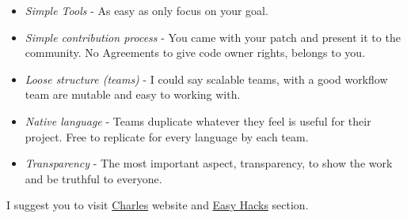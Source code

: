 \begin{itemize}
	\item \textit{Simple Tools} - As easy as only focus on your goal.
	\item \textit{Simple contribution process} - You came with your patch and present it to the community. No Agreements to give code owner rights, belongs to you.
	\item \textit{Loose structure (teams) }- I could say scalable teams, with a good workflow team are mutable and easy to working with.
	\item \textit{Native language} - Teams duplicate whatever they feel is useful for their project. Free to replicate for every language by each team.
	\item \textit{Transparency} - The most important aspect, transparency, to show the work and be truthful to everyone.
\end{itemize}I suggest you to visit \href{http://standardsandfreedom.net/}{Charles} website and \href{https://wiki.documentfoundation.org/Development#Finding_a_first_task:_Easy_Hacks}{Easy Hacks} section.

